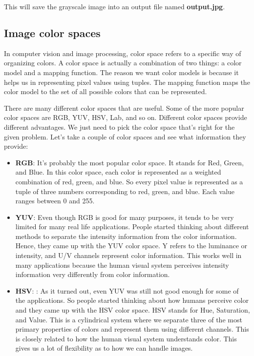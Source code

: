 This will save the grayscale image into an output file named \textbf{output.jpg}.

\subsection{Image color spaces}
In computer vision and image processing, color space refers to a specific way of organizing colors. A color space is actually a combination of two things: a color model and a mapping function. The reason we want color models is because it helps us in representing pixel values using tuples. The mapping function maps the color model to the set of all possible colors that can be represented.

There are many different color spaces that are useful. Some of the more popular color spaces are RGB, YUV, 	HSV, Lab, and so on. Different color spaces provide different advantages. We just need to pick the color space that's 	right for the given problem. Let's take a couple of color spaces and see what information they provide:

\begin{itemize}
	\item \textbf{RGB}: It's probably the most popular color space. It stands for Red, Green, and Blue. In this color space, each 	color is represented as a weighted combination of red, green, and blue. So every pixel value is represented as a tuple 	of three numbers corresponding to red, green, and blue. Each value ranges between 0 and 255.
	
	\item \textbf{YUV}: Even though RGB is good for many purposes, it tends to be very limited for many real life applications. 	People started thinking about different methods to separate the intensity information from the color information. 	Hence, they came up with the YUV color space. Y refers to the luminance or intensity, and U/V channels represent 	color information. This works well in many applications because the human visual system perceives intensity 	information very differently from color information.
	
	\item \textbf{HSV}: : As it turned out, even YUV was still not good enough for some of the applications. So people started 	thinking about how humans perceive color and they came up with the HSV color space. HSV stands for Hue, Saturation, 	and Value. This is a cylindrical system where we separate three of the most primary properties of colors and represent 	them using different channels. This is closely related to how the human visual system understands color. This gives us a lot of flexibility as to how we can handle images.
\end{itemize}

